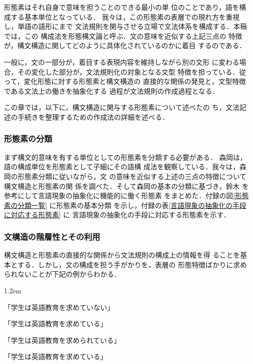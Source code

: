 \smallskip

{\noindent 形態素はそれ自身で意味を担うことのできる最小の単
位\cite{森岡1}のことであり，語を構成する基本単位となっている．}
我々は，この形態素の表層での現れ方を重視し，単語の語形にまで
文法規則を関与させる立場で文法体系を構成する．本稿では，この
構成法を{\dg 形態構文論}と呼ぶ．文の意味を近似する上記三点の
特徴が，構文構造に関してどのように具体化されているのかに着目
するのである．

一般に，文の一部分が，着目する表現内容を維持しながら別の文形
に変わる場合，その変化した部分が，文法規則化の対象となる文型
特徴を担っている．従って，変化形態に対する形態素と構文構造の
直接的な関係の発見と，文型特徴である文法上の働きを抽象化する
過程が文法規則の作成過程となる．

この章では，以下に，構文構造に関与する形態素について述べたの
ち，文法記述の手続きを整理するための作成法の詳細を述べる．

\subsubsection{形態素の分類}
\label{形態素}

まず構文的意味を有する単位としての形態素を分類する必要がある．
森岡\cite{森岡1}は，語の構成単位を形態素として子細にその語構
成法を観察している．我々は，森岡の形態素分類に従いながら，文
の意味を近似する上述の三点の特徴について構文構造と形態素の関
係を調べた．そして森岡\cite{森岡1}の基本の分類に基づき，鈴木
\cite{鈴木}を参考にして言語現象の抽象化に機能的に働く形態素
をまとめた．付録の図\ref{形態素の分類一覧} に形態素の基本分類
を示し，付録の表\ref{言語現象の抽象化の手段に対応する形態素} に
言語現象の抽象化の手段に対応する形態素を示す．


\subsubsection{文構造の階層性とその利用}
\label{階層}

構文構造と形態素の直接的な関係から文法規則の構成上の情報を得
ることを基本とする．しかし，文の構成を担う手がかりを，表層の
形態特徴ばかりに求められないことが下記の例からわかる．


\smallskip

\begin{description}\baselineskip 1.2em
\item [(1)] 「学生は英語教育を求めていない」
\item [(2)] 「学生は英語教育を求めている」
\item [(3)] 「学生は英語教育を求められている」
\item [(4)] 「学生は英語教育を求めている」
\end{description}

